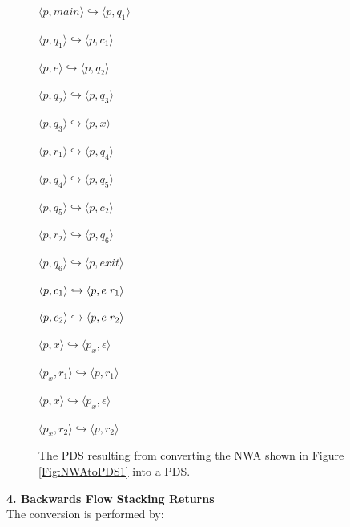 \begin{figure}[htbp]
  \centering
    \begin{description}
      \centering
      \item $\langle p,main \rangle \hookrightarrow \langle p,q_1 \rangle$
      \item $\langle p,q_1 \rangle \hookrightarrow \langle p,c_1 \rangle$
      \item $\langle p,e \rangle \hookrightarrow \langle p,q_2 \rangle$
      \item $\langle p,q_2 \rangle \hookrightarrow \langle p,q_3 \rangle$
      \item $\langle p,q_3 \rangle \hookrightarrow \langle p,x \rangle$
      \item $\langle p,r_1 \rangle \hookrightarrow \langle p,q_4 \rangle$
      \item $\langle p,q_4 \rangle \hookrightarrow \langle p,q_5 \rangle$
      \item $\langle p,q_5 \rangle \hookrightarrow \langle p,c_2 \rangle$
      \item $\langle p,r_2 \rangle \hookrightarrow \langle p,q_6 \rangle$
      \item $\langle p,q_6 \rangle \hookrightarrow \langle p,exit \rangle$
      \item $\langle p,c_1 \rangle \hookrightarrow \langle p,e \hspace{.1cm} r_1 \rangle$
      \item $\langle p,c_2 \rangle \hookrightarrow \langle p,e \hspace{.1cm} r_2 \rangle$
      \item $\langle p,x \rangle \hookrightarrow \langle p_x, \epsilon \rangle$
      \item $\langle p_x,r_1 \rangle \hookrightarrow \langle p,r_1 \rangle$
      \item $\langle p,x \rangle \hookrightarrow \langle p_x, \epsilon \rangle$
      \item $\langle p_x,r_2 \rangle \hookrightarrow \langle p,r_2 \rangle$
    \end{description}
  \caption{The PDS resulting from converting the NWA shown in Figure \ref{Fig:NWAtoPDS1} into a PDS.}
  \label{Fig:NWAtoPDS2}
\end{figure}

\noindent \textbf{4. Backwards Flow Stacking Returns} \\

\noindent The conversion is performed by:

